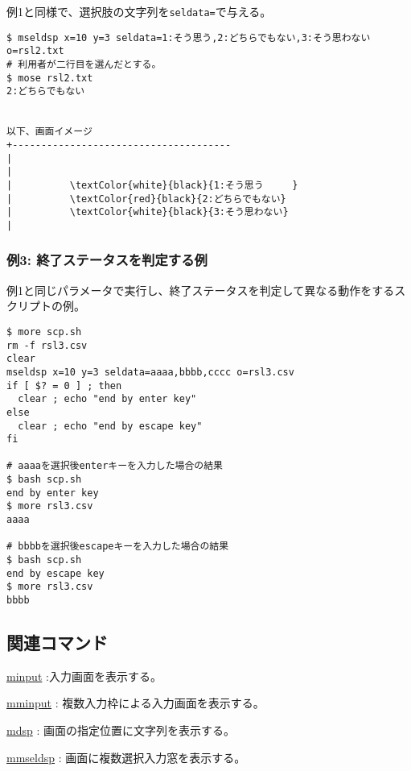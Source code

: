 例1と同様で、選択肢の文字列を\verb|seldata=|で与える。

\begin{Verbatim}[baselinestretch=0.7,frame=single,commandchars=\\\{\}]
$ mseldsp x=10 y=3 seldata=1:そう思う,2:どちらでもない,3:そう思わない o=rsl2.txt
# 利用者が二行目を選んだとする。
$ mose rsl2.txt
2:どちらでもない


以下、画面イメージ
+--------------------------------------
|
|
|          \textColor{white}{black}{1:そう思う　　　}
|          \textColor{red}{black}{2:どちらでもない}
|          \textColor{white}{black}{3:そう思わない}
|
\end{Verbatim}


\subsubsection*{例3: 終了ステータスを判定する例}

例1と同じパラメータで実行し、終了ステータスを判定して異なる動作をするスクリプトの例。

\begin{Verbatim}[baselinestretch=0.7,frame=single]
$ more scp.sh
rm -f rsl3.csv
clear
mseldsp x=10 y=3 seldata=aaaa,bbbb,cccc o=rsl3.csv
if [ $? = 0 ] ; then
  clear ; echo "end by enter key"
else
  clear ; echo "end by escape key"
fi

# aaaaを選択後enterキーを入力した場合の結果
$ bash scp.sh
end by enter key
$ more rsl3.csv
aaaa

# bbbbを選択後escapeキーを入力した場合の結果
$ bash scp.sh
end by escape key
$ more rsl3.csv
bbbb
\end{Verbatim}

\subsection*{関連コマンド}
\hyperref[sect:minput] {minput} :入力画面を表示する。

\hyperref[sect:mminput] {mminput} : 複数入力枠による入力画面を表示する。

\hyperref[sect:mdsp] {mdsp} : 画面の指定位置に文字列を表示する。

\hyperref[sect:mmseldsp] {mmseldsp} : 画面に複数選択入力窓を表示する。


%
